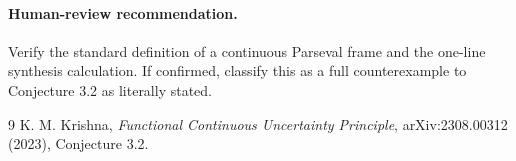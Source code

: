 \documentclass[10pt]{article}
\begin{document}
\paragraph{Human-review recommendation.}
Verify the standard definition of a continuous Parseval frame and the
one-line synthesis calculation.  If confirmed, classify this as a full
counterexample to Conjecture 3.2 as literally stated.

\begin{thebibliography}{9}
K. M. Krishna,
\emph{Functional Continuous Uncertainty Principle},
arXiv:2308.00312 (2023), Conjecture 3.2.
\end{thebibliography}
\end{document}
